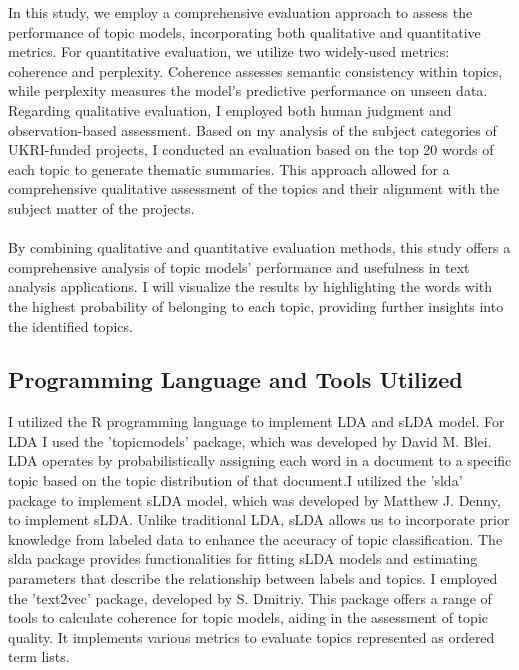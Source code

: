 \documentclass[12pt,twoside]{article}
\begin{document}
In this study, we employ a comprehensive evaluation approach to assess the performance of topic models, incorporating both qualitative and quantitative metrics. For quantitative evaluation, we utilize two widely-used metrics: coherence and perplexity. Coherence assesses semantic consistency within topics, while perplexity measures the model's predictive performance on unseen data. Regarding qualitative evaluation, I employed both human judgment and observation-based assessment. Based on my analysis of the subject categories of UKRI-funded projects, I conducted an evaluation based on the top 20 words of each topic to generate thematic summaries. This approach allowed for a comprehensive qualitative assessment of the topics and their alignment with the subject matter of the projects.\\\\

By combining qualitative and quantitative evaluation methods, this study offers a comprehensive analysis of topic models' performance and usefulness in text analysis applications. I will visualize the results by highlighting the words with the highest probability of belonging to each topic, providing further insights into the identified topics.

\subsection{Programming Language and Tools Utilized}

I utilized the R programming language to implement LDA and sLDA model. For LDA I used the 'topicmodels' package, which was developed by David M. Blei. LDA operates by probabilistically assigning each word in a document to a specific topic based on the topic distribution of that document.I utilized the 'slda' package to implement sLDA model, which was developed by Matthew J. Denny, to implement sLDA. Unlike traditional LDA, sLDA allows us to incorporate prior knowledge from labeled data to enhance the accuracy of topic classification. The slda package provides functionalities for fitting sLDA models and estimating parameters that describe the relationship between labels and topics. I employed the 'text2vec' package, developed by S. Dmitriy. This package offers a range of tools to calculate coherence for topic models, aiding in the assessment of topic quality. It implements various metrics to evaluate topics represented as ordered term lists. 
\end{document}

